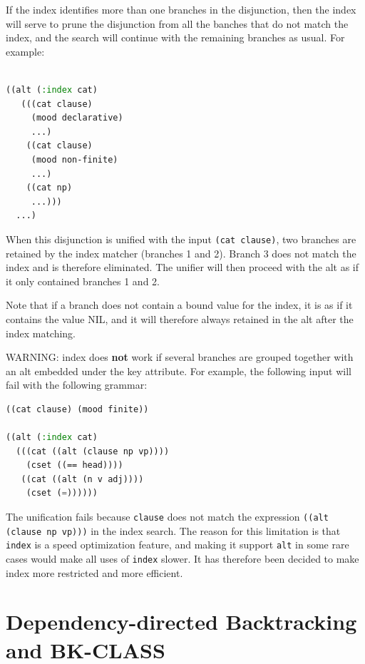 \documentclass[10pt,a4paper]{report}
\begin{document}
If the index identifies more than one branches in the disjunction, then the
index will serve to prune the disjunction from all the banches that do not
match the index, and the search will continue with the remaining branches
as usual.  For example:

\begin{lstlisting}[language=Lisp]

((alt (:index cat)
   (((cat clause)
     (mood declarative)
     ...)
    ((cat clause)
     (mood non-finite)
     ...)
    ((cat np)
     ...)))
  ...)

\end{lstlisting}

When this disjunction is unified with the input {\tt (cat clause)}, two
branches are retained by the index matcher (branches 1 and 2).  Branch 3
does not match the index and is therefore eliminated.  The unifier will
then proceed with the alt as if it only contained branches 1 and 2.  

Note that if a branch does not contain a bound value for the index, it is
as if it contains the value NIL, and it will therefore always retained in
the alt after the index matching.

WARNING: index does {\bf not} work if several branches are grouped together
with an alt embedded under the key attribute.  For example, the following
input will fail with the following grammar:

\begin{lstlisting}[language=Lisp]
((cat clause) (mood finite))

((alt (:index cat)
  (((cat ((alt (clause np vp))))
    (cset ((== head))))
   ((cat ((alt (n v adj))))
    (cset (=))))))
\end{lstlisting} 

The unification fails because {\tt clause} does not match the expression
{\tt ((alt (clause np vp)))} in the index search.  The reason for this
limitation is that {\tt index} is a speed optimization feature, and making it
support {\tt alt} in some rare cases would make all uses of {\tt index} slower.
It has therefore been decided to make index more restricted and more
efficient. 



\section{Dependency-directed Backtracking and BK-CLASS}
\label{bk-class}
\end{document}
